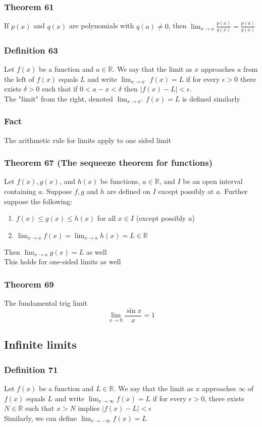 \documentclass[12pt, letterpaper]{article}
\begin{document}
\subsubsection*{Theorem 61}
If $p(x)$ and $q(x)$ are polynomials with $q(a) \neq 0$, then $\displaystyle\lim_{x\to a} \frac{p(x)}{q(x)} = \frac{p(a)}{q(a)}$
\subsubsection*{Definition 63}
Let $f(x)$ be a function and $a\in\mathbb{R}$. We say that the limit as $x$ approaches $a$ from the left of $f(x)$ equals $L$
and write $\displaystyle\lim_{x\to a^-} f(x) = L$ if for every $\epsilon > 0$ there exists $\delta > 0$ such that if $0 < a-x < \delta$
then $|f(x) - L| < \epsilon$. \\
The "limit" from the right, denoted $\displaystyle\lim_{x\to a^+} f(x) = L$ is defined similarly
\subsubsection*{Fact}
The arithmetic rule for limits apply to one sided limit
\subsubsection*{Theorem 67 (The sequeeze theorem for functions)}
Let $f(x), g(x)$, and $h(x)$ be functions, $a\in\mathbb{R}$, and $I$ be an open interval containing $a$. Suppose $f,g$ and $h$
are defined on $I$ except possibly at $a$. Further suppose the following: 
\begin{enumerate}
    \item $f(x) \leq g(x) \leq h(x)$ for all $x\in I$ (except possibly $a$)
    \item $\displaystyle\lim_{x\to a} f(x) = \displaystyle\lim_{x\to a} h(x) = L \in \mathbb{R}$
\end{enumerate}
Then $\displaystyle\lim_{x\to a} g(x) = L$ as well \\
This holds for one-sided limits as well
\subsubsection*{Theorem 69}
The fundamental trig limit \[ \displaystyle\lim_{x\to 0} \frac{\sin x}{x} = 1 \]
\subsection{Infinite limits}
\subsubsection*{Definition 71}
Let $f(x)$ be a function and $L \in \mathbb{R}$. We say that the limit as $x$ approaches $\infty$ of $f(x)$
equals $L$ and write $\displaystyle\lim_{x\to\infty} f(x) = L$ if for every $\epsilon > 0$, there exists $N \in \mathbb{R}$
such that $x > N$ implies $|f(x) - L| < \epsilon$ \\
Similarly, we can define $\displaystyle\lim_{x\to -\infty} f(x) = L$
\end{document}
